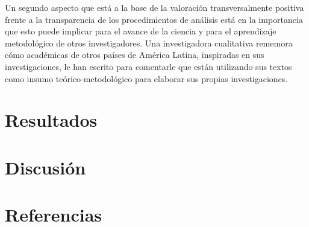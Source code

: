 \documentclass[
  letterpaper,
  DIV=11,
  numbers=noendperiod]{scrreprt}
\newlength{\cslhangindent}
\newlength{\cslentryspacingunit} %
\newenvironment{CSLReferences}[2] %
 {%
  \setlength{\parindent}{0pt}
  \ifodd #1
  \let\oldpar\par
  \def\par{\hangindent=\cslhangindent\oldpar}
  \fi
  \setlength{\parskip}{#2\cslentryspacingunit}
 }%
 {}
\begin{document}
Un segundo aspecto que está a la base de la valoración transversalmente
positiva frente a la transparencia de los procedimientos de análisis
está en la importancia que esto puede implicar para el avance de la
ciencia y para el aprendizaje metodológico de otros investigadores. Una
investigadora cualitativa rememora cómo académicas de otros países de
América Latina, inspiradas en sus investigaciones, le han escrito para
comentarle que están utilizando sus textos como insumo
teórico-metodológico para elaborar sus propias investigaciones.


\hypertarget{resultados}{%
\chapter{Resultados}\label{resultados}}


\hypertarget{discusiuxf3n}{%
\chapter{Discusión}\label{discusiuxf3n}}


\hypertarget{referencias}{%
\chapter*{Referencias}\label{referencias}}


\hypertarget{refs}{}
\begin{CSLReferences}{0}{0}
\end{CSLReferences}
\end{document}
